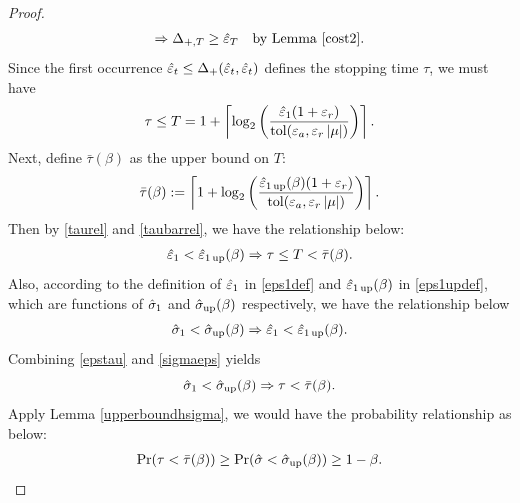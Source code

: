 \documentclass{iitthesis}
\theoremstyle{definition}
\begin{document}
\begin{proof}
\begin{align*}
\Rightarrow \Delta_{+,T} \ge \hat{\varepsilon}_{T} \text{\quad by Lemma \ref{cost2}}.
\end{align*}
Since the first occurrence $\hat{\varepsilon}_t \leq \Delta_+(\hat{\varepsilon}_t,\hat{\varepsilon}_t)$ defines the stopping time $\tau$, we must have
\begin{align}\label{taurel}
\tau \le T= 1+\left \lceil \log_{2} \left(\frac{\hat{\varepsilon}_{1}(1+\varepsilon_r)}{ \operatorname{tol}(\varepsilon_a,\varepsilon_r \left \lvert \mu \right \rvert)}\right) \right \rceil.
\end{align}
Next, define $\bar{\tau}(\beta)$ as the upper bound on $T$:
\begin{align}\label{taubarrel}
\bar{\tau}(\beta):= \left \lceil 1+\log_2 \left(\frac{\hat{\varepsilon}_{1\operatorname{up}}(\beta)(1+\varepsilon_r)}{ \operatorname{tol}(\varepsilon_a,\varepsilon_r \left \lvert \mu \right \rvert)}\right) \right \rceil.
\end{align}
Then by \eqref{taurel} and \eqref{taubarrel}, we have the relationship below:
\begin{align} \label{epstau}
 \hat{\varepsilon}_1 <\hat{\varepsilon}_{1\operatorname{up}}(\beta) \Rightarrow \tau \le T<\bar{\tau}(\beta).
\end{align}
Also, according to the definition of $\hat{\varepsilon}_1$ in \eqref{eps1def} and $\hat{\varepsilon}_{1\operatorname{up}}(\beta)$ in \eqref{eps1updef}, which are functions of $\hat{\sigma}_1$ and $\hat{\sigma}_{\operatorname{up}}(\beta)$ respectively, we have the relationship below
\begin{align}\label{sigmaeps}
 \hat{\sigma}_1 < \hat{\sigma}_{\operatorname{up}}(\beta) \Rightarrow \hat{\varepsilon}_1 < \hat{\varepsilon}_{1\operatorname{up}}(\beta).
\end{align}
Combining \eqref{epstau} and \eqref{sigmaeps} yields
$$\hat{\sigma}_1 < \hat{\sigma}_{\operatorname{up}}(\beta) \Rightarrow\tau <\bar{\tau}(\beta).$$
Apply Lemma \ref{upperboundhsigma}, we would have the probability relationship as below: 
\begin{align*}
\Pr(\tau < \bar{\tau}(\beta)) \geq  \Pr(\hat{\sigma} < \hat{\sigma}_{\operatorname{up}}(\beta)) \geq 1-\beta.
\end{align*}
\end{proof}
\end{document}

